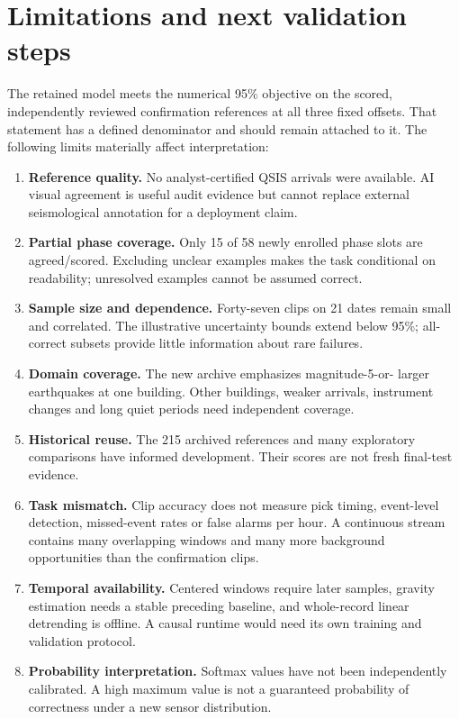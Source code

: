 \documentclass[a4paper,11pt,oneside]{article}
\begin{document}
\section{Limitations and next validation steps}
The retained model meets the numerical 95\% objective on the scored,
independently reviewed confirmation references at all three fixed offsets.
That statement has a defined denominator and should remain attached to it.
The following limits materially affect interpretation:
\begin{enumerate}
\item \textbf{Reference quality.} No analyst-certified QSIS arrivals were
available. AI visual agreement is useful audit evidence but cannot replace
external seismological annotation for a deployment claim.
\item \textbf{Partial phase coverage.} Only 15 of 58 newly enrolled phase
slots are agreed/scored. Excluding unclear examples makes the task
conditional on readability; unresolved examples cannot be assumed correct.
\item \textbf{Sample size and dependence.} Forty-seven clips on 21 dates
remain small and correlated. The illustrative uncertainty bounds extend below
95\%; all-correct subsets provide little information about rare failures.
\item \textbf{Domain coverage.} The new archive emphasizes magnitude-5-or-
larger earthquakes at one building. Other buildings, weaker arrivals,
instrument changes and long quiet periods need independent coverage.
\item \textbf{Historical reuse.} The 215 archived references and many
exploratory comparisons have informed development. Their scores are not
fresh final-test evidence.
\item \textbf{Task mismatch.} Clip accuracy does not measure pick timing,
event-level detection, missed-event rates or false alarms per hour. A
continuous stream contains many overlapping windows and many more background
opportunities than the confirmation clips.
\item \textbf{Temporal availability.} Centered windows require later samples,
gravity estimation needs a stable preceding baseline, and whole-record
linear detrending is offline. A causal runtime would need its own training
and validation protocol.
\item \textbf{Probability interpretation.} Softmax values have not been
independently calibrated. A high maximum value is not a guaranteed
probability of correctness under a new sensor distribution.
\end{enumerate}
\end{document}
